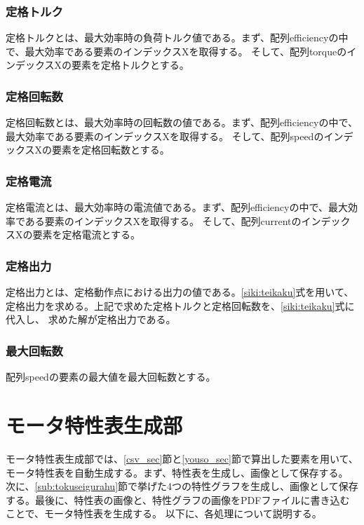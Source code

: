 \subsubsection{定格トルク}\label{sub:sub:teikakutoruku}
定格トルクとは、最大効率時の負荷トルク値である。まず、配列efficiencyの中で、最大効率である要素のインデックスXを取得する。
そして、配列torqueのインデックスXの要素を定格トルクとする。

\subsubsection{定格回転数}\label{sub:sub:teikakukaiten}
定格回転数とは、最大効率時の回転数の値である。まず、配列efficiencyの中で、最大効率である要素のインデックスXを取得する。
そして、配列speedのインデックスXの要素を定格回転数とする。

\subsubsection{定格電流}\label{sub:sub:teikakuden}
定格電流とは、最大効率時の電流値である。まず、配列efficiencyの中で、最大効率である要素のインデックスXを取得する。
そして、配列currentのインデックスXの要素を定格電流とする。

\subsubsection{定格出力}\label{sub:sub:teikakusyutu}
定格出力とは、定格動作点における出力の値である。\ref{siki:teikaku}式を用いて、定格出力を求める。上記で求めた定格トルクと定格回転数を、\ref{siki:teikaku}式に代入し、
求めた解が定格出力である。

\subsubsection{最大回転数}\label{sub:sub:saidaikai}
配列speedの要素の最大値を最大回転数とする。

\section{モータ特性表生成部}\label{mortoku_sec}
モータ特性表生成部では、\ref{csv_sec}節と\ref{youso_sec}節で算出した要素を用いて、モータ特性表を自動生成する。まず、特性表を生成し、画像として保存する。
次に、\ref{sub:tokuseigurahu}節で挙げた4つの特性グラフを生成し、画像として保存する。最後に、特性表の画像と、特性グラフの画像をPDFファイルに書き込むことで、モータ特性表を生成する。
以下に、各処理について説明する。

